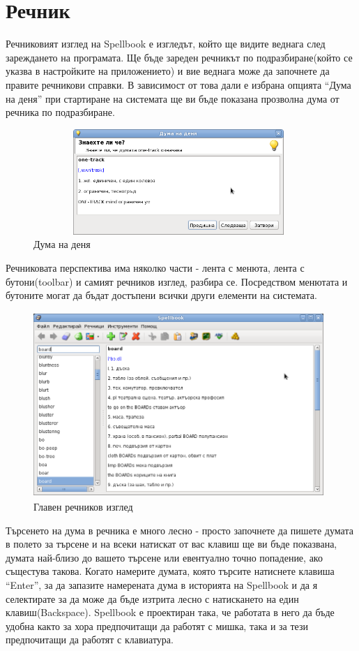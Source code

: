 \section{Речник}
Речниковият изглед на Spellbook е изгледът, който ще видите веднага
след зареждането на програмата. Ще бъде зареден речникът по
подразбиране(който се указва в настройките на приложението) и вие
веднага може да започнете да правите речникови справки. В зависимост
от това дали е избрана опцията "`Дума на деня"' при стартиране на
системата ще ви бъде показана прозволна дума от речника по подразбиране.
\begin{figure}[htbp]
  \caption{Дума на деня}
  \centering
  \includegraphics[width=110mm, height=40mm]{images/word_of_the_day.png}
\end{figure}

Речниковата перспектива има няколко части - лента с менюта, лента с
бутони(toolbar) и самият речников изглед, разбира се. Посредством
менютата и бутоните могат да бъдат достъпени всички други елементи на системата.
\begin{figure}[htbp]
  \caption{Главен речников изглед}
  \centering
  \includegraphics[width=110mm, height=70mm]{images/dictionary_view.png}
\end{figure}

Търсенето на дума в речника е много лесно - просто започнете да пишете
думата в полето за търсене и на всеки натискат от вас клавиш ще ви
бъде показвана, думата най-близо до вашето търсене или евентуално
точно попадение, ако същестува такова. Когато намерите думата, която
търсите натиснете клавиша "`Enter"', за да запазите намерената дума в
историята на Spellbook и да я селектирате за да може да бъде изтрита
лесно с натискането на един клавиш(Backspace). Spellbook е проектиран
така, че работата в него да бъде удобна както за хора предпочитащи да
работят с мишка, така и за тези предпочитащи да работят с клавиатура.

